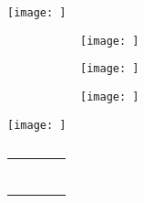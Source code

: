 
{\hfill\texttt{[image: ]}\hfill}


\begin{figure}%
	\centering
	\begin{subfigure}[b]{1\textwidth}
		\texttt{[image: ]}
		\subcaption{}\label{fig:}
	\end{subfigure}
	\qquad
	\begin{subfigure}[b]{1\textwidth}
		\texttt{[image: ]}
		\subcaption{}\label{fig:}
	\end{subfigure}
	\bigskip
	
	\begin{subfigure}[b]{1\textwidth}
		\texttt{[image: ]}
		\subcaption{}\label{fig:}
	\end{subfigure}
	\caption{}\label{fig:}
\end{figure}


\begin{SCfigure}%
	\centering
	\texttt{[image: ]}
	\caption{}\label{fig:}
\end{SCfigure}


\begin{table}%
	\caption{ }\label{fig:}
	\begin{center}
	\begin{tabular}{p{4cm}|c|c|c|}
	\hline
	\rule[0ex]{-4pt}{3ex}
	\multirow{2}{*}{text}
	\end{tabular}
	\end{center}
\end{table}